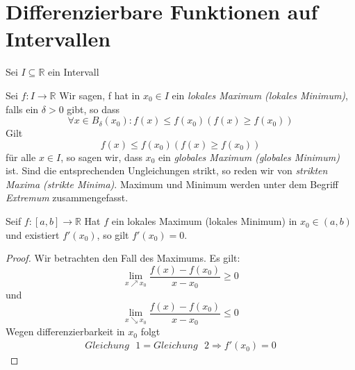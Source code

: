 \section{Differenzierbare Funktionen auf Intervallen}
Sei $I \subseteq \mathbb{R}$ ein Intervall
\begin{Definition}{
	Sei $f: I \rightarrow \mathbb{R}$ Wir sagen, f hat in $x_0 \in I$ ein 
	\emph{lokales Maximum (lokales Minimum)}, falls ein $\delta > 0$ gibt,
	so dass 
	\begin{equation*}
	\forall x \in B_\delta(x_0) : f(x) \leq f(x_0) (f(x) \geq f(x_0))
	\end{equation*}
	Gilt 
	\begin{equation*}
		f(x) \leq f(x_0) (f(x) \geq f(x_0))
	\end{equation*}
	 für alle $x \in I$, so sagen wir, dass 
	$x_0$ ein \emph{globales Maximum (globales Minimum)} ist.
	Sind die entsprechenden Ungleichungen strikt, so reden wir von 
	\emph{strikten Maxima (strikte Minima)}. Maximum und Minimum werden unter dem 
	Begriff \emph{Extremum} zusammengefasst.
}\end{Definition}

\begin{Satz}{
	\label{satz_8}
	Seif $f:[a,b] \rightarrow \mathbb{R}$ Hat $f$ ein lokales Maximum (lokales 
	Minimum) in $x_0 \in (a,b)$ und existiert $f'(x_0)$, so gilt 
	$f'(x_0) = 0$.
}\end{Satz}

\begin{proof}
	Wir betrachten den Fall des Maximums.
	Es gilt:
	\begin{equation*}
		\label{gleichung:bedingungi}
		\lim\limits_{x \nearrow x_0}{ \frac{f(x)-f(x_0)}{x-x_0} \geq 0}
	\end{equation*}
	und
	\begin{equation*}
		\label{gleichung:bedingungii}
		\lim\limits_{x \searrow x_0}{\frac{f(x)-f(x_0)}{x-x_0} \leq 0}
	\end{equation*}
	Wegen differenzierbarkeit in $x_0$ folgt
	\begin{align*}
		Gleichung\text{ }1 = Gleichung \text{ }2 \Rightarrow 
		f'(x_0) = 0
	\end{align*}	
\end{proof}